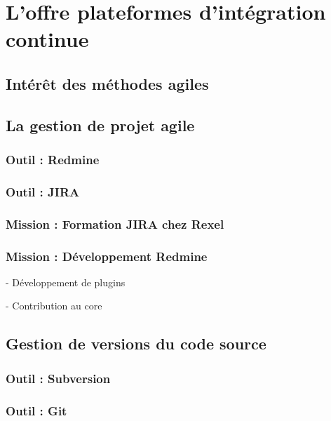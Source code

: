 \section{L'offre \og{} plateformes d'intégration continue \fg}
\label{section:pic}

\subsection{Intérêt des méthodes agiles}



\subsection{La gestion de projet agile}

\subsubsection{Outil : Redmine}

\subsubsection{Outil : JIRA}

\subsubsection{Mission : Formation JIRA chez Rexel}

\subsubsection{Mission : Développement Redmine}

- Développement de plugins

- Contribution au core



\subsection{Gestion de versions du code source}

\subsubsection{Outil : Subversion}

\subsubsection{Outil : Git}

